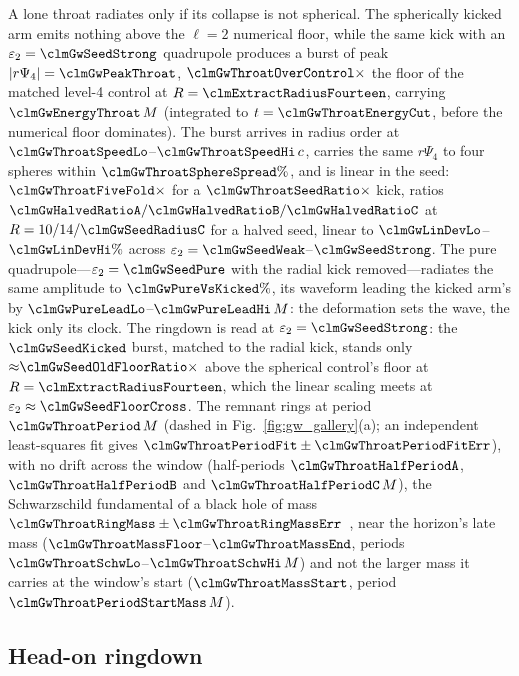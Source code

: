 \documentclass[twocolumn,floatfix,aps,prd,superscriptaddress,nofootinbib]{revtex4-2}
\begin{document}
A lone throat radiates only if its collapse is not spherical. The spherically kicked arm emits nothing above the $\ell=2$ numerical floor, while the same kick with an $\varepsilon_2=\clmGwSeedStrong$ quadrupole produces a burst of peak $|r\Psi_4|=\clmGwPeakThroat$, $\clmGwThroatOverControl\times$ the floor of the matched level-4 control at $R=\clmExtractRadiusFourteen$, carrying $\clmGwEnergyThroat\,M$ (integrated to $t=\clmGwThroatEnergyCut$, before the numerical floor dominates). The burst arrives in radius order at $\clmGwThroatSpeedLo$--$\clmGwThroatSpeedHi\,c$, carries the same $r\Psi_4$ to four spheres within $\clmGwThroatSphereSpread\%$, and is linear in the seed: $\clmGwThroatFiveFold\times$ for a $\clmGwThroatSeedRatio\times$ kick, ratios $\clmGwHalvedRatioA/\clmGwHalvedRatioB/\clmGwHalvedRatioC$ at $R=10/14/\clmGwSeedRadiusC$ for a halved seed, linear to $\clmGwLinDevLo$--$\clmGwLinDevHi\%$ across $\varepsilon_2=\clmGwSeedWeak$--$\clmGwSeedStrong$. The pure quadrupole---$\varepsilon_2=\clmGwSeedPure$ with the radial kick removed---radiates the same amplitude to $\clmGwPureVsKicked\%$, its waveform leading the kicked arm's by $\clmGwPureLeadLo$--$\clmGwPureLeadHi\,M$: the deformation sets the wave, the kick only its clock. The ringdown is read at $\varepsilon_2=\clmGwSeedStrong$: the $\clmGwSeedKicked$ burst, matched to the radial kick, stands only ${\approx}\clmGwSeedOldFloorRatio\times$ above the spherical control's floor at $R=\clmExtractRadiusFourteen$, which the linear scaling meets at $\varepsilon_2\approx\clmGwSeedFloorCross$. The remnant rings at period $\clmGwThroatPeriod\,M$ (dashed in Fig.~\ref{fig:gw_gallery}(a); an independent least-squares fit gives $\clmGwThroatPeriodFit\pm\clmGwThroatPeriodFitErr$), with no drift across the window (half-periods $\clmGwThroatHalfPeriodA$, $\clmGwThroatHalfPeriodB$ and $\clmGwThroatHalfPeriodC\,M$), the Schwarzschild fundamental of a black hole of mass $\clmGwThroatRingMass\pm\clmGwThroatRingMassErr$~\cite{berti2009}, near the horizon's late mass ($\clmGwThroatMassFloor$--$\clmGwThroatMassEnd$, periods $\clmGwThroatSchwLo$--$\clmGwThroatSchwHi\,M$) and not the larger mass it carries at the window's start ($\clmGwThroatMassStart$, period $\clmGwThroatPeriodStartMass\,M$).

\subsection{Head-on ringdown}
\label{sec:headon:wave}
\end{document}

